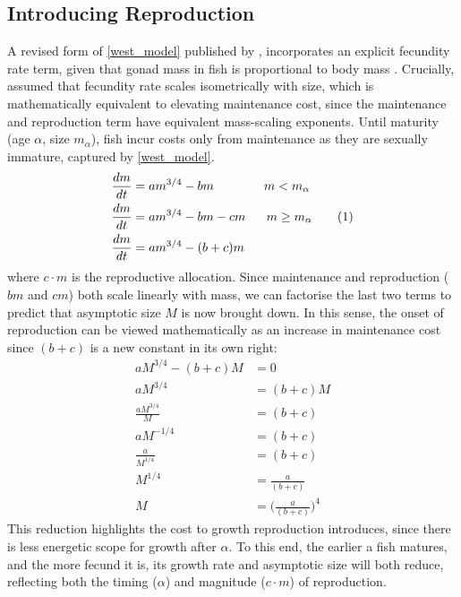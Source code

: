 \documentclass[a4paper]{article} %
\newcommand\numberthis{\addtocounter{equation}{1}\tag{\theequation}}
\begin{document}
\subsection{Introducing Reproduction}
A revised form of \cref{west_model} published by \textcite{Charnov2001}, incorporates an explicit fecundity rate term, given that gonad mass in fish is proportional to body mass \autocite{Charnov2001, Roff1983, peters1983, kozlowski1996}. Crucially, \textcite{Charnov2001} assumed that fecundity rate scales isometrically with size, which is mathematically equivalent to elevating maintenance cost, since the maintenance and reproduction term have equivalent mass-scaling exponents. Until maturity (age $\alpha$, size $m_{\alpha}$), fish incur costs only from maintenance as they are sexually immature, captured by \cref{west_model}. 
\begin{align*}
    \frac{dm}{dt} &= am^{3/4} - bm \ \ \ \ \ \ \ \ \ \ \ \ m < m_{\alpha} \\
    \frac{dm}{dt} &= am^{3/4} - bm - cm \ \ \ \ \ m \geq m_{\alpha} \numberthis \label{charnov2001} \\
    \frac{dm}{dt} &= am^{3/4} - (b+c)m
\end{align*}
where $c \cdot m$ is the reproductive allocation. Since maintenance and reproduction ($bm$ and $cm$) both scale linearly with mass, we can factorise the last two terms to predict that asymptotic size $M$ is now brought down. In this sense, the onset of reproduction can be viewed mathematically as an increase in maintenance cost since $(b+c)$ is a new constant in its own right:
\begin{align*}
    aM^{3/4} - (b+c)M &= 0 \\
    aM^{3/4} &= (b+c)M \\
    \frac{aM^{3/4}}{M} &= (b+c) \\
    aM^{-1/4} &= (b+c) \\
    \frac{a}{M^{1/4}} &= (b+c) \\
    M^{1/4} &= \frac{a}{(b+c)} \\
    M &= \Bigg(\frac{a}{(b+c)}\Bigg)^4
\end{align*}
This reduction highlights the cost to growth reproduction introduces, since there is less energetic scope for growth after $\alpha$. To this end, the earlier a fish matures, and the more fecund it is, its growth rate and asymptotic size will both reduce, reflecting both the timing ($\alpha$) and magnitude ($c\cdot{m}$) of reproduction.
\end{document}
